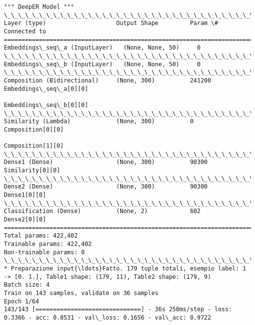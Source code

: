 \documentclass[11pt]{article}
\begin{document}
\begin{Verbatim}[commandchars=\\\{\}]
°°° DeepER Model °°°
\_\_\_\_\_\_\_\_\_\_\_\_\_\_\_\_\_\_\_\_\_\_\_\_\_\_\_\_\_\_\_\_\_\_\_\_\_\_\_\_\_\_\_\_\_\_\_\_\_\_\_\_\_\_\_\_\_\_\_\_\_\_\_\_\_\_\_\_\_\_\_\_\_\_\_\_\_\_\_\_\_\_\_\_\_\_\_\_\_\_\_\_\_\_\_\_\_\_
Layer (type)                    Output Shape         Param \#     Connected to                     
==================================================================================================
Embeddings\_seq\_a (InputLayer)   (None, None, 50)     0                                            
\_\_\_\_\_\_\_\_\_\_\_\_\_\_\_\_\_\_\_\_\_\_\_\_\_\_\_\_\_\_\_\_\_\_\_\_\_\_\_\_\_\_\_\_\_\_\_\_\_\_\_\_\_\_\_\_\_\_\_\_\_\_\_\_\_\_\_\_\_\_\_\_\_\_\_\_\_\_\_\_\_\_\_\_\_\_\_\_\_\_\_\_\_\_\_\_\_\_
Embeddings\_seq\_b (InputLayer)   (None, None, 50)     0                                            
\_\_\_\_\_\_\_\_\_\_\_\_\_\_\_\_\_\_\_\_\_\_\_\_\_\_\_\_\_\_\_\_\_\_\_\_\_\_\_\_\_\_\_\_\_\_\_\_\_\_\_\_\_\_\_\_\_\_\_\_\_\_\_\_\_\_\_\_\_\_\_\_\_\_\_\_\_\_\_\_\_\_\_\_\_\_\_\_\_\_\_\_\_\_\_\_\_\_
Composition (Bidirectional)     (None, 300)          241200      Embeddings\_seq\_a[0][0]           
                                                                 Embeddings\_seq\_b[0][0]           
\_\_\_\_\_\_\_\_\_\_\_\_\_\_\_\_\_\_\_\_\_\_\_\_\_\_\_\_\_\_\_\_\_\_\_\_\_\_\_\_\_\_\_\_\_\_\_\_\_\_\_\_\_\_\_\_\_\_\_\_\_\_\_\_\_\_\_\_\_\_\_\_\_\_\_\_\_\_\_\_\_\_\_\_\_\_\_\_\_\_\_\_\_\_\_\_\_\_
Similarity (Lambda)             (None, 300)          0           Composition[0][0]                
                                                                 Composition[1][0]                
\_\_\_\_\_\_\_\_\_\_\_\_\_\_\_\_\_\_\_\_\_\_\_\_\_\_\_\_\_\_\_\_\_\_\_\_\_\_\_\_\_\_\_\_\_\_\_\_\_\_\_\_\_\_\_\_\_\_\_\_\_\_\_\_\_\_\_\_\_\_\_\_\_\_\_\_\_\_\_\_\_\_\_\_\_\_\_\_\_\_\_\_\_\_\_\_\_\_
Dense1 (Dense)                  (None, 300)          90300       Similarity[0][0]                 
\_\_\_\_\_\_\_\_\_\_\_\_\_\_\_\_\_\_\_\_\_\_\_\_\_\_\_\_\_\_\_\_\_\_\_\_\_\_\_\_\_\_\_\_\_\_\_\_\_\_\_\_\_\_\_\_\_\_\_\_\_\_\_\_\_\_\_\_\_\_\_\_\_\_\_\_\_\_\_\_\_\_\_\_\_\_\_\_\_\_\_\_\_\_\_\_\_\_
Dense2 (Dense)                  (None, 300)          90300       Dense1[0][0]                     
\_\_\_\_\_\_\_\_\_\_\_\_\_\_\_\_\_\_\_\_\_\_\_\_\_\_\_\_\_\_\_\_\_\_\_\_\_\_\_\_\_\_\_\_\_\_\_\_\_\_\_\_\_\_\_\_\_\_\_\_\_\_\_\_\_\_\_\_\_\_\_\_\_\_\_\_\_\_\_\_\_\_\_\_\_\_\_\_\_\_\_\_\_\_\_\_\_\_
Classification (Dense)          (None, 2)            602         Dense2[0][0]                     
==================================================================================================
Total params: 422,402
Trainable params: 422,402
Non-trainable params: 0
\_\_\_\_\_\_\_\_\_\_\_\_\_\_\_\_\_\_\_\_\_\_\_\_\_\_\_\_\_\_\_\_\_\_\_\_\_\_\_\_\_\_\_\_\_\_\_\_\_\_\_\_\_\_\_\_\_\_\_\_\_\_\_\_\_\_\_\_\_\_\_\_\_\_\_\_\_\_\_\_\_\_\_\_\_\_\_\_\_\_\_\_\_\_\_\_\_\_
* Preparazione input{\ldots}Fatto. 179 tuple totali, esempio label: 1 -> [0. 1.], Table1 shape: (179, 11), Table2 shape: (179, 9)
Batch size: 4
Train on 143 samples, validate on 36 samples
Epoch 1/64
143/143 [==============================] - 36s 250ms/step - loss: 0.3366 - acc: 0.8531 - val\_loss: 0.1656 - val\_acc: 0.9722


\end{Verbatim}
\end{document}
